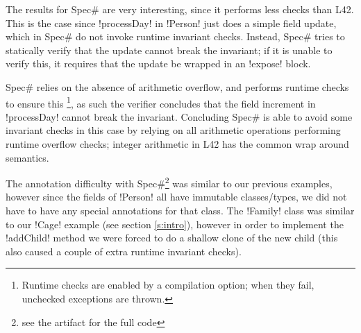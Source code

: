 The results for Spec\# are very interesting, since it performs less checks than L42.
This is the case since \Q!processDay! in \Q!Person! just does a simple field update, which in Spec\# do not invoke runtime invariant checks. Instead, Spec\# tries to statically verify that the update cannot break the invariant; if it is unable to verify this, it requires that the update be wrapped in an \Q!expose! block. 

Spec\# relies on the absence of arithmetic overflow, and performs runtime checks to ensure this%
\footnote{%
Runtime checks are enabled by a compilation option; when they fail, unchecked exceptions are thrown.
}, as such the verifier concludes that the field increment in \Q!processDay! cannot break the invariant.
Concluding Spec\# is able to avoid some invariant checks in this case 
by relying on all arithmetic operations performing runtime overflow checks;
integer arithmetic in L42 has the common wrap around semantics.









The annotation difficulty with Spec\#\footnote{see the artifact for the full code} was similar to our previous examples, however since the fields of \Q!Person! all have immutable classes/types, we did not have to have any special annotations for that class. The \Q!Family! class was similar to our \Q!Cage! example (see section \ref{s:intro}), however in order to implement the \Q!addChild! method we were forced to do a shallow clone of the new child (this also caused a couple of extra runtime invariant checks).
